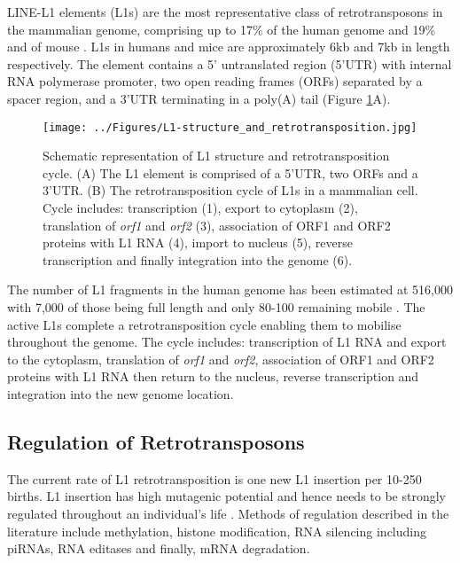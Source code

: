 \documentclass[12pt]{article}
\begin{document}
			LINE-L1 elements (L1s) are the most representative class of retrotransposons in the mammalian genome, comprising up to 17\%  of the human genome and 19\% and of mouse \citep{Belancio08,Bodak14,Graham06}.
			L1s in humans and mice are approximately 6kb and 7kb in length respectively.
			The element contains a 5' untranslated region (5'UTR) with internal RNA polymerase promoter, two open reading frames (ORFs) separated by a spacer region, and a 3'UTR terminating in a poly(A) tail (Figure \ref{L1-structure-RT}A)\citep{Belancio07,Bodak14}.
			
				\begin{figure}[tb] %
					\centering
					\texttt{[image: ../Figures/L1-structure\_and\_retrotransposition.jpg]}
					\caption{Schematic representation of L1 structure and retrotransposition cycle.
					(A) The L1 element is comprised of a 5'UTR, two ORFs and a 3'UTR.
					(B) The retrotransposition cycle of L1s in a mammalian cell.
					Cycle includes: transcription (1), export to cytoplasm (2), translation of \textit{orf1} and \textit{orf2} (3), association of ORF1 and ORF2 proteins with L1 RNA (4), import to nucleus (5), reverse transcription and finally integration into the genome (6). \citep[adapted from:][]{Bodak14}}
					\label{L1-structure-RT}
				\end{figure}

			The number of L1 fragments in the human genome has been estimated at 516,000 \citep{Lander01} with 7,000 of those being full length \citep{Khan03} and only 80-100 remaining mobile \citep{Brouha03}.
			The active L1s complete a retrotransposition cycle enabling them to mobilise throughout the genome.
			The cycle includes: transcription of L1 RNA and export to the cytoplasm, translation of \textit{orf1} and \textit{orf2}, association of ORF1 and ORF2 proteins with L1 RNA then return to the nucleus, reverse transcription and integration into the new genome location. 
			


		\subsection{Regulation of Retrotransposons}
		
			The current rate of L1 retrotransposition is one new L1 insertion per 10-250 births. %
			L1 insertion has high mutagenic potential and hence needs to be strongly regulated throughout an individual's life \citep{Castaneda11}.
			Methods of regulation described in the literature include methylation, histone modification, RNA silencing including piRNAs, RNA editases and finally, mRNA degradation. 
			
\end{document}
